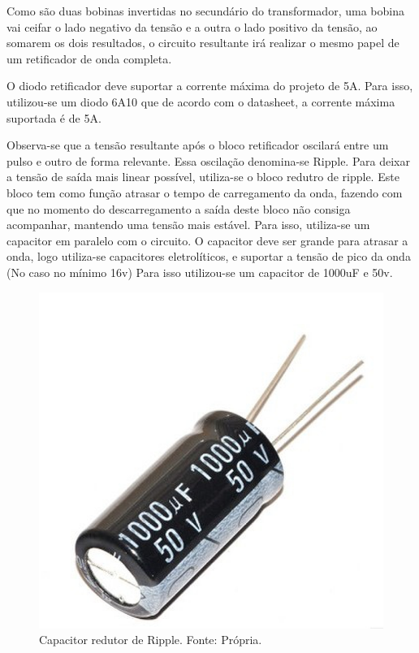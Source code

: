             	Como são duas bobinas invertidas no secundário do transformador, uma bobina 					vai ceifar o lado negativo da tensão e a outra o lado positivo da tensão, ao 					somarem os dois resultados, o circuito resultante irá realizar o mesmo papel 					de um retificador de onda completa.
            	
				O diodo retificador deve suportar a corrente máxima do projeto de 5A. Para 						isso, utilizou-se um diodo 6A10 que de acordo com o datasheet, a corrente 						máxima suportada é de 5A.
				
				Observa-se que a tensão resultante após o bloco retificador oscilará entre um 					pulso e outro de forma relevante. Essa oscilação denomina-se Ripple. Para 						deixar a tensão de saída mais linear possível, utiliza-se o bloco redutro de 					ripple. Este bloco  tem como função atrasar o tempo de carregamento da onda, 					fazendo com que no momento do descarregamento a saída deste bloco não consiga 					acompanhar, mantendo uma tensão mais estável. Para isso, utiliza-se um 							capacitor em paralelo com o circuito. O capacitor deve ser grande para atrasar 				a onda, logo utiliza-se capacitores eletrolíticos, e suportar a tensão de pico 				da onda (No caso no mínimo 16v) Para isso utilizou-se um capacitor de 1000uF e 				50v.

                \begin{figure}[!htb]
            		\centering
            		\includegraphics[scale= 0.2]{figuras/Capacitor.jpg}
            		\caption{Capacitor redutor de Ripple. Fonte: Própria.}
            		\label{capacitor}
            	\end{figure}
            	
